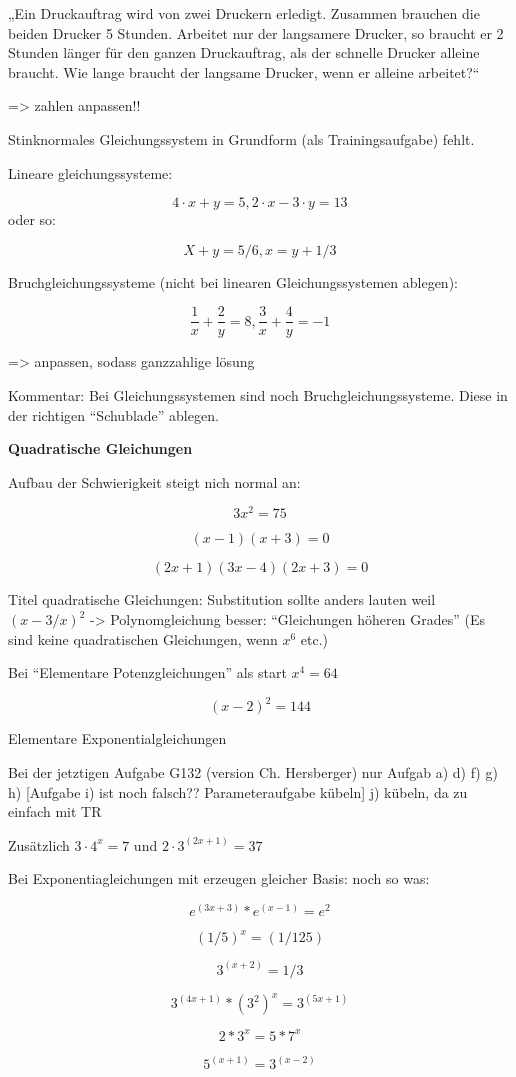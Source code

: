  

„Ein Druckauftrag wird von zwei Druckern erledigt. Zusammen brauchen die beiden Drucker 5 Stunden. Arbeitet nur der langsamere Drucker, so braucht er 2 Stunden länger für den ganzen Druckauftrag, als der schnelle Drucker alleine braucht. Wie lange braucht der langsame Drucker, wenn er alleine arbeitet?“ 

=> zahlen anpassen!!



Stinknormales Gleichungssystem in Grundform (als Trainingsaufgabe)
fehlt.

Lineare gleichungssysteme: 

$$4\cdot{}x+y=5, 2\cdot{}x-3\cdot{}y=13$$
oder so:

$$X+y=5/6, x=y+1/3 $$

Bruchgleichungssysteme (nicht bei linearen Gleichungssystemen ablegen): 

$$\frac{1}{x} + \frac{2}{y} = 8, \frac{3}{x} + \frac{4}{y} = -1 $$

=> anpassen, sodass ganzzahlige lösung

Kommentar: Bei Gleichungssystemen sind noch
Bruchgleichungssysteme. Diese in der richtigen ``Schublade'' ablegen.


\textbf{Quadratische Gleichungen}

Aufbau der Schwierigkeit steigt nich normal an:

$$3x^2=75$$

$$\left(x-1\right)\left(x+3\right)=0 $$

$$\left(2x+1\right)\left(3x-4\right)\left(2x+3\right)=0 $$

Titel quadratische Gleichungen: Substitution sollte anders lauten
weil $(x-3/x)^2$ -> Polynomgleichung besser: ``Gleichungen höheren
Grades'' (Es sind keine quadratischen Gleichungen, wenn $x^6$ etc.)

Bei ``Elementare Potenzgleichungen'' als start $x^4 = 64$

$$(x-2)^2 = 144$$


Elementare Exponentialgleichungen 

Bei der jetztigen Aufgabe G132 (version Ch. Hersberger) nur Aufgab
a) d) f) g) h)    [Aufgabe i) ist noch falsch?? Parameteraufgabe kübeln]
j) kübeln, da zu einfach mit TR

Zusätzlich $3\cdot{} 4^x = 7$
und $2\cdot{}3^(2x+1)=37 $






Bei Exponentiagleichungen mit erzeugen gleicher Basis:
noch so was:

$$e^(3x+3)*e^(x-1)=e^2 $$


$$(1/5)^x = (1/125)$$

$$3^(x+2)=1/3$$
 
$$3^(4x+1)*(3^2)^x=3^(5x+1) $$

$$2*3^x = 5*7^x$$

$$5^(x+1)=3^(x-2) $$


